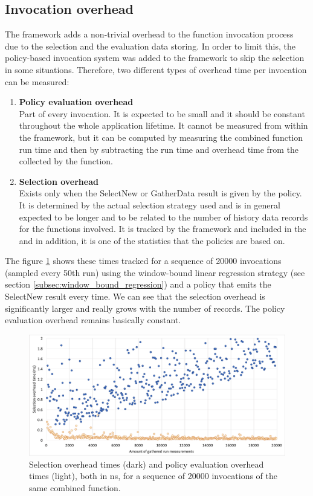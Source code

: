 \subsection{Invocation overhead}

The framework adds a non-trivial overhead to the function invocation process due to the selection and the evaluation data storing. In order to limit this, the policy-based invocation system was added to the framework to skip the selection in some situations. Therefore, two different types of overhead time per invocation can be measured:

\begin{enumerate}
	\item \textbf{Policy evaluation overhead}\\
	Part of every invocation. It is expected to be small and it should be constant throughout the whole application lifetime. It cannot be measured from within the framework, but it can be computed by measuring the combined function run time and then by subtracting the run time and overhead time from the  collected by the function.
	\item \textbf{Selection overhead}\\
	Exists only when the SelectNew or GatherData result is given by the policy. It is determined by the actual selection strategy used and is in general expected to be longer and to be related to the number of history data records for the functions involved. It is tracked by the framework and included in the  and in addition, it is one of the statistics that the policies are based on.
\end{enumerate}

The figure \ref{fig:overhead_sel_policy} shows these times tracked for a sequence of 20000 invocations (sampled every 50th run) using the window-bound linear regression strategy (see section \ref{subsec:window_bound_regression}) and a policy that emits the SelectNew result every time. We can see that the selection overhead is significantly larger and really grows with the number of records. The policy evaluation overhead remains basically constant.

\begin{figure}[h!]
	\captionsetup{justification=centering,margin=0.5cm}
	\centerline{\mbox{\includegraphics[width=140mm]{./img/overhead_sel_policy.png}}}
	\caption{Selection overhead times (dark) and policy evaluation overhead times (light), both in ns, for a sequence of 20000 invocations of the same combined function.}
	\label{fig:overhead_sel_policy}
\end{figure}

